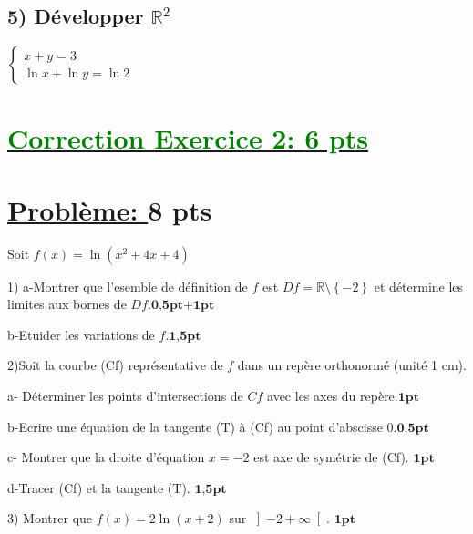 \documentclass[12pt]{article}
\begin{document}
\subsection*{ 5) Développer $\mathbb{R}^{2}$} 
\( \begin{cases}
x + y = 3 \\
\ln x + \ln y = \ln 2
\end{cases}\)
\section*{\underline{\textcolor{green}{Correction Exercice 2: \textbf{6 pts}}}}
\section*{\underline{Problème: }\textbf{8 pts}}
Soit $f(x)=\ln(x^{2}+4x+4)$

1) a-Montrer que l'esemble de définition de $f$ est $Df=\mathbb{R}\setminus\left\lbrace -2 \right\rbrace $ et détermine les limites aux bornes de $Df$.$\textbf{0,5pt+1pt}$

b-Etuider les variations de $f$.$\textbf{1,5pt}$

2)Soit la courbe (Cf) représentative de $f$ dans un repère orthonormé (unité 1 cm).

a- Déterminer les points d'intersections de $Cf$ avec les axes du repère.$\textbf{1pt}$

b-Ecrire une équation de la tangente (T) à (Cf) au point d'abscisse 0.$\textbf{0,5pt}$

c- Montrer que la droite d'équation $x=-2$ est axe de  symétrie de (Cf). $\textbf{1pt}$

d-Tracer (Cf) et la tangente (T). $\textbf{1,5pt}$

3) Montrer que $f(x)=2\ln(x+2)$ sur $ \left]-2 +\infty \right[ $. $\textbf{1pt}$
\end{document}
